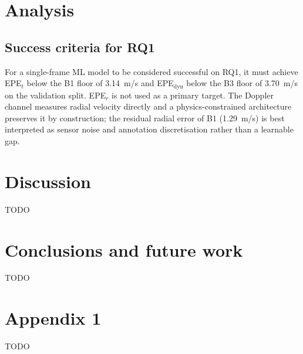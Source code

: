 \documentclass[a4paper,12pt]{article}
\begin{document}
\section{Analysis}
\label{Analysis}

\subsection{Success criteria for RQ1}

For a single-frame ML model to be considered successful on RQ1, it must achieve EPE$_t$ below the B1 floor of 3.14~m/s and EPE$_\mathrm{dyn}$ below the B3 floor of 3.70~m/s on the validation split. EPE$_r$ is not used as a primary target. The Doppler channel measures radial velocity directly and a physics-constrained architecture preserves it by construction; the residual radial error of B1 (1.29~m/s) is best interpreted as sensor noise and annotation discretisation rather than a learnable gap.


\newpage

\section{Discussion}
\label{Discussion}

TODO


\newpage

\section{Conclusions and future work}
\label{Conclusions and Future Work}

TODO


\newpage

\hypersetup{urlcolor=black}


\newpage

\setcounter{page}{1}
\appendix

\section{Appendix 1}

TODO
\end{document}
